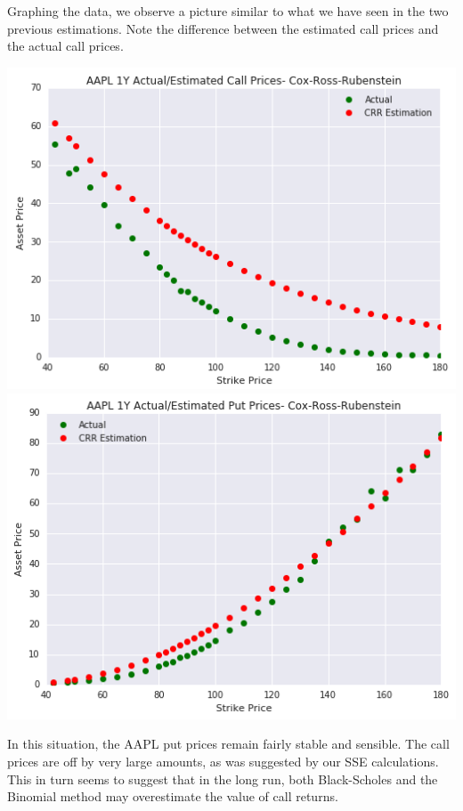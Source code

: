 Graphing the data, we observe a picture similar to what we have seen in the two previous estimations. Note the difference between the estimated call prices and the actual call prices.

\begin{center}
\includegraphics[scale=0.66, keepaspectratio=true]{Chapter3/AAPL1YCall.png}
\includegraphics[scale=0.66, keepaspectratio=true]{Chapter3/AAPL1YPut.png}
\end{center}

In this situation, the AAPL put prices remain fairly stable and sensible. The call prices are off by very large amounts, as was suggested by our SSE calculations. This in turn seems to suggest that in the long run, both Black-Scholes and the Binomial method may overestimate the value of call returns.


